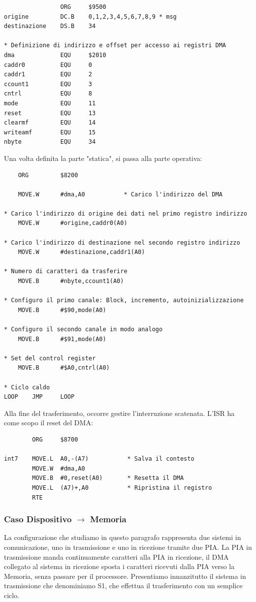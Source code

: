 \begin{lstlisting}
                ORG     $9500
origine         DC.B    0,1,2,3,4,5,6,7,8,9 * msg
destinazione    DS.B    34

* Definizione di indirizzo e offset per accesso ai registri DMA
dma             EQU     $2010
caddr0          EQU     0
caddr1          EQU     2
ccount1         EQU     3
cntrl           EQU     8
mode            EQU     11
reset           EQU     13
clearmf         EQU     14
writeamf        EQU     15
nbyte           EQU     34
\end{lstlisting}

Una volta definita la parte "statica", si passa alla parte operativa:

\begin{lstlisting}
    ORG         $8200 

    MOVE.W      #dma,A0           * Carico l'indirizzo del DMA

* Carico l'indirizzo di origine dei dati nel primo registro indirizzo
    MOVE.W      #origine,caddr0(A0)

* Carico l'indirizzo di destinazione nel secondo registro indirizzo
    MOVE.W      #destinazione,caddr1(A0)

* Numero di caratteri da trasferire
    MOVE.B      #nbyte,ccount1(A0)

* Configuro il primo canale: Block, incremento, autoinizializzazione
    MOVE.B      #$90,mode(A0)

* Configuro il secondo canale in modo analogo
    MOVE.B      #$91,mode(A0)

* Set del control register
    MOVE.B      #$A0,cntrl(A0)

* Ciclo caldo
LOOP    JMP     LOOP
\end{lstlisting}

Alla fine del trasferimento, occorre gestire l'interruzione scatenata. L'ISR ha come scopo il reset del DMA:

\begin{lstlisting}
        ORG     $8700

int7    MOVE.L  A0,-(A7)           * Salva il contesto
        MOVE.W  #dma,A0
        MOVE.B  #0,reset(A0)       * Resetta il DMA
        MOVE.L  (A7)+,A0           * Ripristina il registro
        RTE
\end{lstlisting}

\subsubsection{Caso Dispositivo $\rightarrow$ Memoria}
La configurazione che studiamo in questo paragrafo rappresenta due sistemi in comunicazione, uno in trasmissione e uno in ricezione tramite due PIA. La PIA in trasmissione manda continuamente caratteri alla PIA in ricezione, il DMA collegato al sistema in ricezione sposta i caratteri ricevuti dalla PIA verso la Memoria, senza passare per il processore. 
Presentiamo innanzitutto il sistema in trasmissione che denominiamo S1, che effettua il trasferimento con un semplice ciclo.

